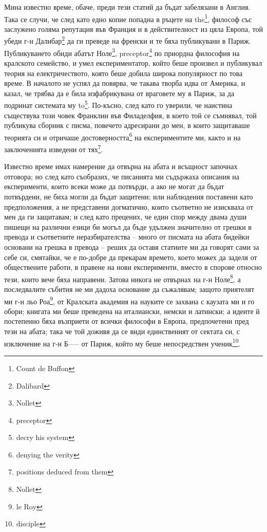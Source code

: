 \documentclass[12pt]{book}
\begin{document}
Мина известно време, обаче, преди тези статий да бъдат забелязани в Англия. Така се случи, че след като едно копие попадна в ръцете на the\footnote{Count de Buffon}, философ със заслужено голяма репутация във Франция и в действителност из цяла Европа, той убеди г-н Далибар\footnote{Dalibard} да ги преведе на френски и те бяха публикувани в Париж. Публикуването обиди абатът Ноле\footnote{Nollet}, preceptor\footnote{preceptor} по приордна философия на кралското семейство, и умел експериментатор, който беше произвел и публикувал теория на електричеството, която беше добила широка популярност по това време. В началото не успял да повярва, че такава творба идва от Америка, и казал, че трябва да е била изфабрикувана от враговете му в Париж, за да подринат системата му to\footnote{decry his system}. По-късно, след като го уверили, че наистина съществува този човек Франклин във Филаделфия, в което той се съмнявал, той публикува сборник с писма, повечето адресирани до мен, в които защитаваше теорията си и отричаше достоверността\footnote{denying the verity} на експериментите ми, както и на заключенията изведени от тях\footnote{positions deduced from them}. 

Известно време имах намерение да отвърна на абата и всъщност започнах отговора; но след като съобразих, че писанията ми съдържаха описания на експерименти, които всеки може да потвърди, а ако не могат да бъдат потвърдени, не биха могли да бъдат защитени; или наблюдения поставени като предположения, а не представени догматично, които съответно не изискваха от мен да ги защитавам; и след като прецених, че един спор между двама души пишещи на различни езици би могъл да бъде удължен значително от грешки в превода и съответните неразбирателства – много от писмата на абата бидейки основани на грешка в превода – реших да оставя статиите ми да говорят сами за себе си, смятайки, че е по-добре да прекарам времето, което можех да заделя от обществените работи, в правене на нови експерименти, вместо в спорове относно тези, които вече бяха направени. Затова никога не отвърнах на г-н Ноле\footnote{Nollet}, а последвалите събития не ми дадоха основание да съжалявам; защото приятелят ми г-н льо Роа\footnote{le Roy}, от Кралската академия на науките се захвана с каузата ми и го обори; книгата ми беше преведена на италиански, немски и латински; а идеите й постепенно бяха възприети от всички философи в Европа, предпочетени пред тези на абата; така че той доживя да се види единственият от сектата си, с изключение на г-н Б----- от Париж, който му беше непосредствен ученик\footnote{disciple}. 
\end{document}
